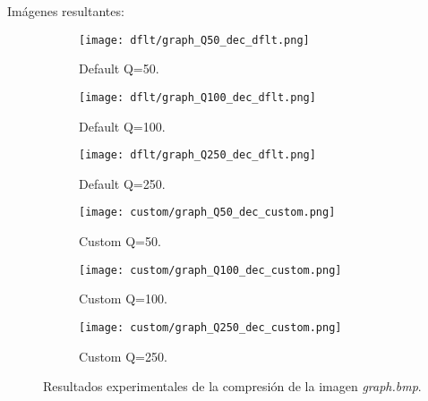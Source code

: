 \documentclass[12pt,a4paper]{article}
\begin{document}
Imágenes resultantes:
\begin{figure}   [H]
    \begin{subfigure}{0.30\textwidth}
        \centering
        \texttt{[image: dflt/graph\_Q50\_dec\_dflt.png]}
        \caption{Default Q=50.}
        
    \end{subfigure}
    \hfill
    \begin{subfigure}{0.30\textwidth}
        \centering
        \texttt{[image: dflt/graph\_Q100\_dec\_dflt.png]}
        \caption{Default Q=100.}
        
    \end{subfigure}
    \hfill
    \begin{subfigure}{0.30\textwidth}
        \centering
        \texttt{[image: dflt/graph\_Q250\_dec\_dflt.png]}
        \caption{Default Q=250.}
        
    \end{subfigure}
    
    \vspace{0.5cm}
    
    \begin{subfigure}{0.30\textwidth}
        \centering
        \texttt{[image: custom/graph\_Q50\_dec\_custom.png]}
        \caption{Custom Q=50.}
        
    \end{subfigure}
    \hfill
    \begin{subfigure}{0.30\textwidth}
        \centering
        \texttt{[image: custom/graph\_Q100\_dec\_custom.png]}
        \caption{Custom Q=100.}
        
    \end{subfigure}
    \hfill
    \begin{subfigure}{0.30\textwidth}
        \centering
        \texttt{[image: custom/graph\_Q250\_dec\_custom.png]}
        \caption{Custom Q=250.}
        
    \end{subfigure}
    
    \caption[Resultados experimentales - graph]{Resultados experimentales de la compresión de la imagen \textit{graph.bmp}.}
    
\end{figure}
\end{document}

